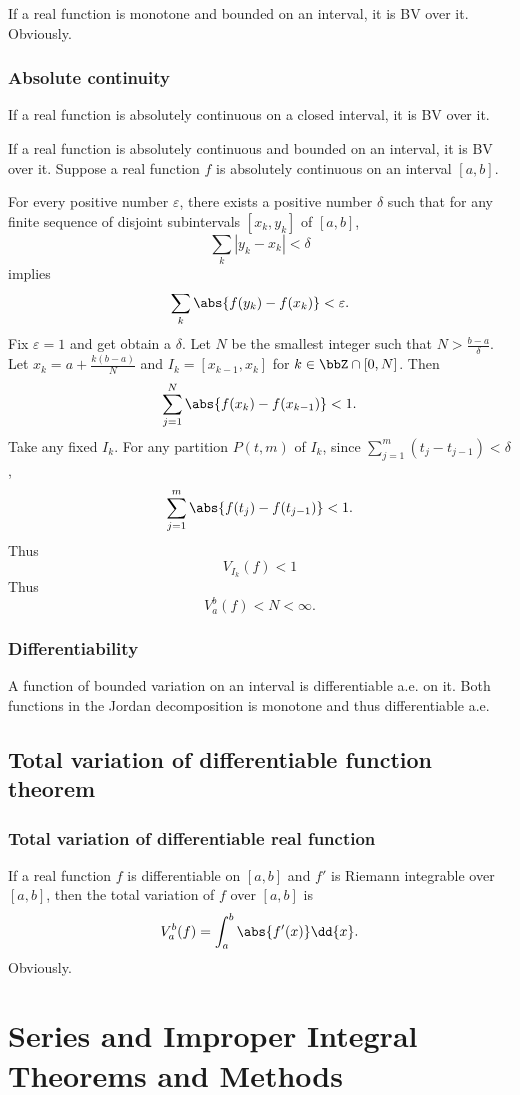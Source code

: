 \documentclass[a4paper,12pt]{report}
\begin{document}
\begin{itemize}
\begin{itemize}
If a real function is monotone and bounded on an interval, it is BV over it.
\bpr
Obviously.
\epr
\subsubsection{Absolute continuity}
If a real function is absolutely continuous on a closed interval, it is BV over it.

If a real function is absolutely continuous and bounded on an interval, it is BV over it. 
\bpr
Suppose a real function $f$ is absolutely continuous on an interval $[a,b]$.

For every positive number $\varepsilon$, there exists a positive number $\delta$ such that for any finite sequence of disjoint subintervals $[x_k, y_k]$ of $[a,b]$,
\[\sum_{k}\left|y_{k}-x_{k}\right|<\delta\]
implies
\[\sum_{k}\abs{f(y_{k})-f(x_{k})}<\varepsilon.\]
Fix $\varepsilon=1$ and get obtain a $\delta$. Let $N$ be the smallest integer such that $N>\frac{b-a}{\delta}$. Let $x_k=a+\frac{k(b-a)}{N}$ and $I_k=[x_{k-1},x_k]$ for $k\in\bbZ\cap[0,N]$. Then
\[\sum_{j=1}^N\abs{f(x_k)-f(x_{k-1})}<1.\]
Take any fixed $I_k$. For any partition $P(t,m)$ of $I_k$, since $\sum_{j=1}^m(t_j-t_{j-1})<\delta$,
\[\sum_{j=1}^m\abs{f(t_j)-f(t_{j-1})}<1.\]
Thus
\[V_{I_k}(f)<1\]
Thus
\[V_a^b(f)<N<\infty.\]
\epr
\subsubsection{Differentiability}
A function of bounded variation on an interval is differentiable a.e. on it.
\bpr
Both functions in the Jordan decomposition is monotone and thus differentiable a.e.
\epr
\subsection{Total variation of differentiable function theorem}
\subsubsection{Total variation of differentiable real function}
If a real function $f$ is differentiable on $[a,b]$ and $f'$ is Riemann integrable over $[a,b]$, then the total variation of $f$ over $[a,b]$ is
\[V_a^b(f)=\int_a^b\abs{f'(x)}\dd{x}.\]
\bpr
Obviously.
\epr



\section{Series and Improper Integral Theorems and Methods}

\end{itemize}
\end{itemize}
\end{document}
